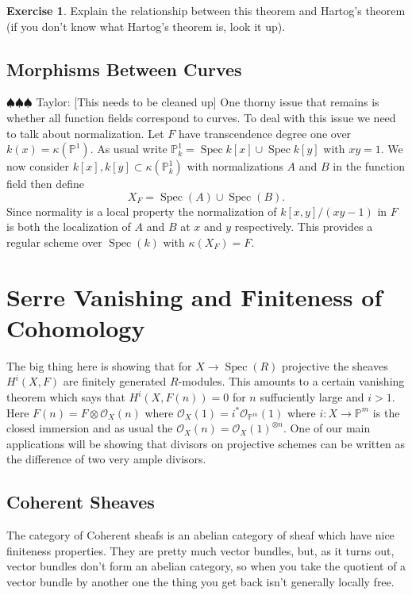 \documentclass[12pt]{article}
\numberwithin{equation}{section}
\theoremstyle{definition}
\newtheorem{exercise}[theorem]{Exercise}
\theoremstyle{remark}
\newcommand{\Ocal}{\mathcal{O}}
\newcommand{\PP}{\mathbb{P}}
\newcommand{\Spec}{\operatorname{Spec}}
\newcommand{\taylor}[1]{{\color{blue} \sf $\spadesuit\spadesuit\spadesuit$ Taylor: [#1]}}
\begin{document}
\begin{exercise}
	Explain the relationship between this theorem and Hartog's theorem (if you don't know what Hartog's theorem is, look it up).
\end{exercise}

\subsection{Morphisms Between Curves}
\taylor{This needs to be cleaned up}
One thorny issue that remains is whether all function fields correspond to curves. 
To deal with this issue we need to talk about normalization. 
Let $F$ have transcendence degree one over $k(x) =\kappa(\PP^1)$.
As usual write $\PP^1_k = \Spec k[x] \cup \Spec k[y]$ with $xy=1$. 
We now consider $k[x], k[y] \subset \kappa(\PP^1_k)$ with normalizations $A$ and $B$ in the function field then define 
$$ X_F = \Spec(A) \cup \Spec(B). $$
Since normality is a local property the normalization of $k[x,y]/(xy-1)$ in $F$ is both the localization of $A$ and $B$ at $x$ and $y$ respectively. 
This provides a regular scheme over $\Spec(k)$ with $\kappa(X_F)=F$.
 

\section{Serre Vanishing and Finiteness of Cohomology}

The big thing here is showing that for $X\to \Spec(R)$ projective the sheaves $H^i(X,F)$ are finitely generated $R$-modules. 
This amounts to a certain vanishing theorem which says that $H^i(X,F(n))=0$ for $n$ suffuciently large and $i>1$.
Here $F(n) = F\otimes \Ocal_X(n)$ where $\Ocal_X(1) = i^* \Ocal_{\PP^m}(1)$ where $i:X \to \PP^m$ is the closed immersion and as usual the $\Ocal_X(n) = \Ocal_X(1)^{\otimes n}$.
One of our main applications will be showing that divisors on projective schemes can be written as the difference of two very ample divisors.

\subsection{Coherent Sheaves}
The category of Coherent sheafs is an abelian category of sheaf which have nice finiteness properties. 
They are pretty much vector bundles, but, as it turns out, vector bundles don't form an abelian category, so when you take the quotient of a vector bundle by another one the thing you get back isn't generally locally free. 
\end{document}
